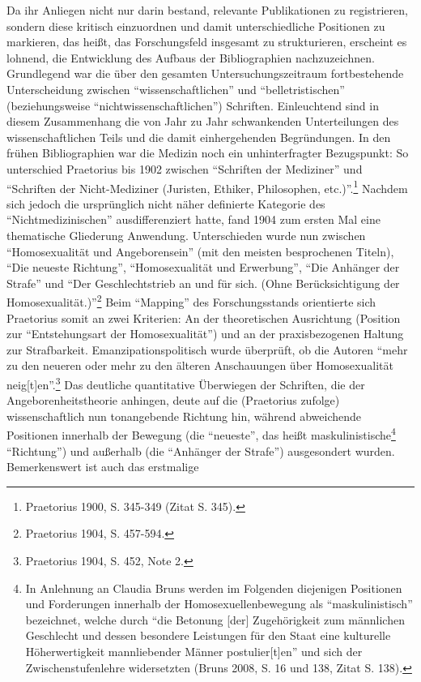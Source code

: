 \documentclass[a4paper,
fontsize=11pt,
oneside,
numbers=noperiodatend,
parskip=half-,
bibliography=totoc,
final
]{scrartcl}
\begin{document}
Da ihr Anliegen nicht nur darin bestand, relevante Publikationen zu
registrieren, sondern diese kritisch einzuordnen und damit
unterschiedliche Positionen zu markieren, das heißt, das Forschungsfeld
insgesamt zu strukturieren, erscheint es lohnend, die Entwicklung des
Aufbaus der Bibliographien nachzuzeichnen. Grundlegend war die über den
gesamten Untersuchungszeitraum fortbestehende Unterscheidung zwischen
\enquote{wissenschaftlichen} und \enquote{belletristischen}
(beziehungsweise \enquote{nichtwissenschaftlichen}) Schriften.
Einleuchtend sind in diesem Zusammenhang die von Jahr zu Jahr
schwankenden Unterteilungen des wissenschaftlichen Teils und die damit
einhergehenden Begründungen. In den frühen Bibliographien war die
Medizin noch ein unhinterfragter Bezugspunkt: So unterschied Praetorius
bis 1902 zwischen \enquote{Schriften der Mediziner} und
\enquote{Schriften der Nicht-Mediziner (Juristen, Ethiker, Philosophen,
etc.)}.\footnote{Praetorius 1900, S. 345-349 (Zitat S. 345).} Nachdem
sich jedoch die ursprünglich nicht näher definierte Kategorie des
\enquote{Nichtmedizinischen} ausdifferenziert hatte, fand 1904 zum
ersten Mal eine thematische Gliederung Anwendung. Unterschieden wurde
nun zwischen \enquote{Homosexualität und Angeborensein} (mit den meisten
besprochenen Titeln), \enquote{Die neueste Richtung},
\enquote{Homosexualität und Erwerbung}, \enquote{Die Anhänger der
Strafe} und \enquote{Der Geschlechtstrieb an und für sich. (Ohne
Berücksichtigung der Homosexualität.)}\footnote{Praetorius 1904, S.
  457-594.} Beim \enquote{Mapping} des Forschungsstands orientierte sich
Praetorius somit an zwei Kriterien: An der theoretischen Ausrichtung
(Position zur \enquote{Entstehungsart der Homosexualität}) und an der
praxisbezogenen Haltung zur Strafbarkeit. Emanzipationspolitisch wurde
überprüft, ob die Autoren \enquote{mehr zu den neueren oder mehr zu den
älteren Anschauungen über Homosexualität neig{[}t{]}en}.\footnote{Praetorius
  1904, S. 452, Note 2.} Das deutliche quantitative Überwiegen der
Schriften, die der Angeborenheitstheorie anhingen, deute auf die
(Praetorius zufolge) wissenschaftlich nun tonangebende Richtung hin,
während abweichende Positionen innerhalb der Bewegung (die
\enquote{neueste}, das heißt maskulinistische\footnote{In Anlehnung an
  Claudia Bruns werden im Folgenden diejenigen Positionen und
  Forderungen innerhalb der Homosexuellenbewegung als
  \enquote{maskulinistisch} bezeichnet, welche durch \enquote{die
  Betonung {[}der{]} Zugehörigkeit zum männlichen Geschlecht und dessen
  besondere Leistungen für den Staat eine kulturelle Höherwertigkeit
  mannliebender Männer postulier{[}t{]}en} und sich der
  Zwischenstufenlehre widersetzten (Bruns 2008, S. 16 und 138, Zitat S.
  138).} \enquote{Richtung}) und außerhalb (die \enquote{Anhänger der
Strafe}) ausgesondert wurden. Bemerkenswert ist auch das erstmalige
\end{document}
